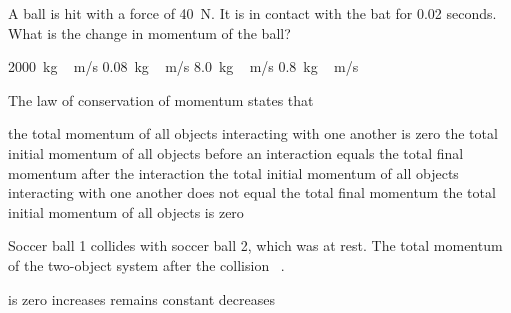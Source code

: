 \documentclass[]{exam}
\begin{document}
\begin{questions}
\question
A ball is hit with a force of \SI{40}{N}. It is in contact with the bat for 0.02 seconds. What is the change in momentum of the ball?

\begin{randomizechoices}
\choice \SI{2000}{kg\,m/s}
\choice \SI{0.08}{kg\,m/s}
\choice \SI{8.0}{kg\,m/s}
\correctchoice \SI{0.8}{kg\,m/s}
\end{randomizechoices}





\question
The law of conservation of momentum states that

\begin{randomizechoices}
    \choice the total momentum of all objects interacting with one another is zero
    \correctchoice the total initial momentum of all objects before an interaction equals the total final momentum after the interaction
    \choice the total initial momentum of all objects interacting with one another does not equal the total final momentum  
    \choice the total initial momentum of all objects is zero 
\end{randomizechoices}

\clearpage
\question
Soccer ball 1 collides with soccer ball 2, which was at rest. The total momentum of the two-object system after the collision \fillin\ .

\begin{randomizechoices}
    \choice is zero
    \choice increases
    \correctchoice remains constant
    \choice decreases
\end{randomizechoices}


\end{questions}
\end{document}
